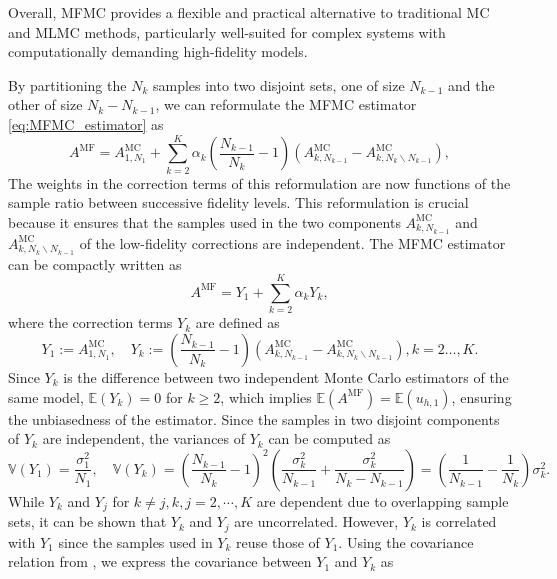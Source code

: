 Overall, MFMC provides a flexible and practical alternative to traditional MC and MLMC methods, particularly well-suited for complex systems with computationally demanding high-fidelity models.



By partitioning the $N_k$ samples into two disjoint sets, one of size $N_{k-1}$ and the other of size $N_k - N_{k-1}$, we can reformulate the MFMC estimator \eqref{eq:MFMC_estimator} as
%
\begin{equation}\label{eq:MFMC_estimator_independent}
    A^{\text{MF}} = A^{\text{MC}}_{1,N_1} +  \sum_{k=2}^K \alpha_k\left(\frac{N_{k-1}}{N_{k}}-1\right)\left(A_{k,N_{k-1}}^{\text{MC}}- A_{k,N_k\backslash N_{k-1}}^{\text{MC}}\right),
\end{equation}
%
The weights in the correction terms of this reformulation  are now functions of the sample ratio between successive fidelity levels. This reformulation is crucial because it ensures that the samples used in  the two components $A_{k,N_{k-1}}^{\text{MC}}$ and $A_{k,N_k\backslash N_{k-1}}^{\text{MC}}$ of the low-fidelity corrections are independent. The MFMC estimator can be compactly written as
%
\begin{equation}\label{eq:MFMC_estimator_Correction}
A^{\text{MF}} = Y_1 + \sum_{k=2}^K \alpha_k Y_k,
\end{equation}
%
where the correction terms $Y_k$ are defined as
%
\[
Y_1 :=A^{\text{MC}}_{1,N_1},\quad Y_k:=\left(\frac{N_{k-1}}{N_{k}}-1\right)\left(A_{k,N_{k-1}}^{\text{MC}}- A_{k,N_k\backslash N_{k-1}}^{\text{MC}}\right), k=2\ldots, K.
\]
%
Since $Y_k$ is the difference between two independent Monte Carlo estimators of the same model, $\mathbb{E}(Y_k) = 0$ for $k\ge 2$, which implies $\mathbb{E}(A^{\text{MF}}) = \mathbb{E}(u_{h,1})$, ensuring the unbiasedness of the estimator. Since the samples in two disjoint components of $Y_k$ are independent, the variances of $Y_k$ can be computed as
%
\[
\mathbb{V}\left(Y_1\right) = \frac{\sigma_1^2}{N_1}, \quad \mathbb{V}\left(Y_k\right) = \left(\frac{N_{k-1}}{N_{k}}-1\right)^2\left(\frac{\sigma_k^2}{N_{k-1}}+\frac{\sigma_k^2}{N_k-N_{k-1}}\right) = \left(\frac{1}{N_{k-1}} - \frac{1}{N_k}\right)\sigma_k^2.
\]
%
While $Y_k$ and $Y_j$ for $k\neq j, k,j=2,\cdots, K$ are dependent due to overlapping sample sets, it can be shown that $Y_k$ and $Y_j$ are uncorrelated. However, $Y_k$  is correlated with $Y_1$ since the samples used in $Y_k$ reuse those of $Y_1$. Using the covariance relation from \cite[Lemma~3.2]{PeWiGu:2016}, we express the covariance between $Y_1$ and $Y_k$ as
